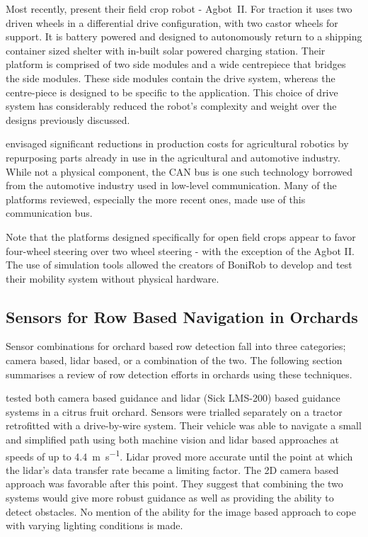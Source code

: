 \documentclass[preprint,authoryear,12pt]{elsarticle}
\begin{document}
        Most recently, \cite{Bawden2017} present their field crop robot - Agbot~II.
        For traction it uses two driven wheels in a differential drive configuration, with two castor wheels for support.
        It is battery powered and designed to autonomously return to a shipping container sized shelter with in-built solar powered charging station.
        Their platform is comprised of two side modules and a wide centrepiece that bridges the side modules.
        These side modules contain the drive system, whereas the centre-piece is designed to be specific to the application.
        This choice of drive system has considerably reduced the robot's complexity and weight over the designs previously discussed.

        \cite{Blackmore2007} envisaged significant reductions in production costs for agricultural robotics by repurposing parts already in use in the agricultural and automotive industry.
        While not a physical component, the CAN bus is one such technology borrowed from the automotive industry used in low-level communication.
        Many of the platforms reviewed, especially the more recent ones, made use of this communication bus.

        Note that the platforms designed specifically for open field crops appear to favor four-wheel steering over two wheel steering - with the exception of the Agbot II.
        The use of simulation tools allowed the creators of BoniRob to develop and test their mobility system without physical hardware.


    \subsection{Sensors for Row Based Navigation in Orchards}

        Sensor combinations for orchard based row detection fall into three categories; camera based, lidar based, or a combination of the two.
        The following section summarises a review of row detection efforts in orchards using these techniques.

        \cite{Subramanian2006} tested both camera based guidance and lidar (Sick LMS-200) based guidance systems in a citrus fruit orchard.
        Sensors were trialled separately on a tractor retrofitted with a drive-by-wire system.
        Their vehicle was able to navigate a small and simplified path using both machine vision and lidar based approaches at speeds of up to \SI{4.4}{\meter\per\second}.
        Lidar proved more accurate until the point at which the lidar's data transfer rate became a limiting factor.
        The 2D camera based approach was favorable after this point.
        They suggest that combining the two systems would give more robust guidance as well as providing the ability to detect obstacles.
        No mention of the ability for the image based approach to cope with varying lighting conditions is made.
\end{document}
